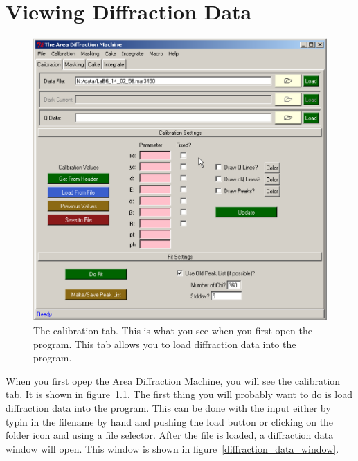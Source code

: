 \chapter{Viewing Diffraction Data}\label{viewing_data}

\begin{figure}
    \centering
    \includegraphics[scale=.75]{figures/calibration_tab.eps}
    \caption{The calibration tab.
    This is what you see when you first open the program. 
    This tab allows you to load diffraction
    data into the program.} 
    \label{calibration_tab}
\end{figure}

When you first opep the Area Diffraction Machine, you
will see the calibration tab. It is shown in 
figure~\ref{calibration_tab}. The first thing you
will probably want to do is load diffraction data into
the program. This can be done with the  input
either by typin in the filename by hand and pushing the
load button or clicking on the folder icon and
using a file selector. After the file is loaded, a
diffraction data window will open. This window is 
shown in figure~\ref{diffraction_data_window}.

